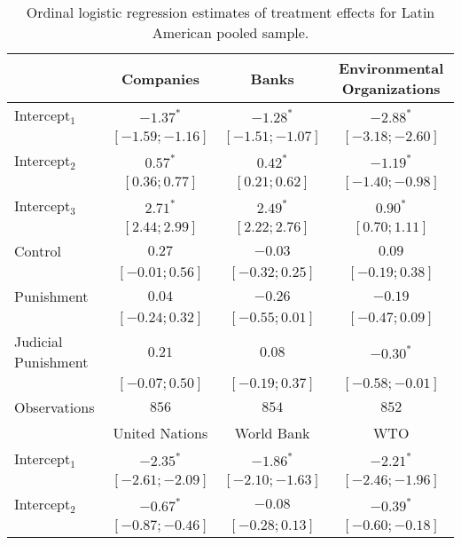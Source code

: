 \begin{table}[h]
\begin{center}
\caption{Ordinal logistic regression estimates of treatment effects for Latin American pooled sample.}
\begin{threeparttable}
\begin{tabular}{l c c c}
\hline
 & Companies & Banks & Environmental
Organizations \\
\hline
Intercept$_1$       & $-1.37^{*}$       & $-1.28^{*}$       & $-2.88^{*}$       \\
                    & $ [-1.59; -1.16]$ & $ [-1.51; -1.07]$ & $ [-3.18; -2.60]$ \\
Intercept$_2$       & $0.57^{*}$        & $0.42^{*}$        & $-1.19^{*}$       \\
                    & $ [ 0.36;  0.77]$ & $ [ 0.21;  0.62]$ & $ [-1.40; -0.98]$ \\
Intercept$_3$       & $2.71^{*}$        & $2.49^{*}$        & $0.90^{*}$        \\
                    & $ [ 2.44;  2.99]$ & $ [ 2.22;  2.76]$ & $ [ 0.70;  1.11]$ \\
Control             & $0.27$            & $-0.03$           & $0.09$            \\
                    & $ [-0.01;  0.56]$ & $ [-0.32;  0.25]$ & $ [-0.19;  0.38]$ \\
Punishment          & $0.04$            & $-0.26$           & $-0.19$           \\
                    & $ [-0.24;  0.32]$ & $ [-0.55;  0.01]$ & $ [-0.47;  0.09]$ \\
Judicial Punishment & $0.21$            & $0.08$            & $-0.30^{*}$       \\
                    & $ [-0.07;  0.50]$ & $ [-0.19;  0.37]$ & $ [-0.58; -0.01]$ \\
\hline
Observations        & $856$             & $854$             & $852$             \\
\hline
 & United Nations & World Bank & WTO \\
\hline
Intercept$_1$       & $-2.35^{*}$       & $-1.86^{*}$       & $-2.21^{*}$       \\
                    & $ [-2.61; -2.09]$ & $ [-2.10; -1.63]$ & $ [-2.46; -1.96]$ \\
Intercept$_2$       & $-0.67^{*}$       & $-0.08$           & $-0.39^{*}$       \\
                    & $ [-0.87; -0.46]$ & $ [-0.28;  0.13]$ & $ [-0.60; -0.18]$ \\

\end{tabular}
\end{threeparttable}
\end{center}
\end{table}
